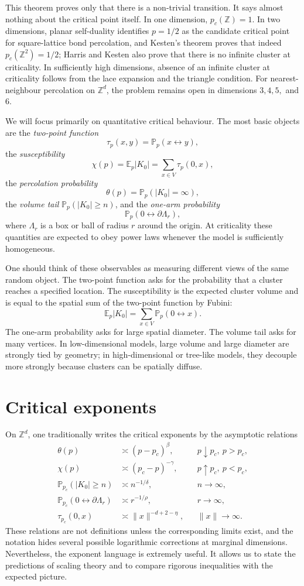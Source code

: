 \documentclass[11pt,reqno]{book}
\numberwithin{equation}{chapter}
\theoremstyle{plain}
\theoremstyle{definition}
\theoremstyle{remark}
\newcommand{\Pp}{\mathbb P_p}
\newcommand{\Ep}{\mathbb E_p}
\renewcommand{\P}{\mathbb P}
\newcommand{\Z}{\mathbb Z}
\newcommand{\1}{\mathbf 1}
\newcommand{\norm}[1]{\lVert #1\rVert}
\newcommand{\as}{\asymp}
\begin{document}
This theorem proves only that there is a non-trivial transition. It says almost nothing about the critical point itself. In one dimension, $p_c(\Z)=1$. In two dimensions, planar self-duality identifies $p=1/2$ as the candidate critical point for square-lattice bond percolation, and Kesten's theorem proves that indeed $p_c(\Z^2)=1/2$; Harris and Kesten also prove that there is no infinite cluster at criticality. In sufficiently high dimensions, absence of an infinite cluster at criticality follows from the lace expansion and the triangle condition. For nearest-neighbour percolation on $\Z^d$, the problem remains open in dimensions $3,4,5,$ and $6$.

We will focus primarily on quantitative critical behaviour. The most basic objects are the \emph{two-point function}
\[
  \tau_p(x,y)=\Pp(x\leftrightarrow y),
\]
the \emph{susceptibility}
\[
  \chi(p)=\Ep |K_0|=\sum_{x\in V}\tau_p(0,x),
\]
the \emph{percolation probability}
\[
  \theta(p)=\Pp(|K_0|=\infty),
\]
the \emph{volume tail} $\Pp(|K_0|\geq n)$, and the \emph{one-arm probability}
\[
  \Pp(0\leftrightarrow \partial \Lambda_r),
\]
where $\Lambda_r$ is a box or ball of radius $r$ around the origin. At criticality these quantities are expected to obey power laws whenever the model is sufficiently homogeneous.

One should think of these observables as measuring different views of the same random object. The two-point function asks for the probability that a cluster reaches a specified location. The susceptibility is the expected cluster volume and is equal to the spatial sum of the two-point function by Fubini:
\[
  \Ep |K_0|
  =
  \sum_{x\in V}\Pp(0\leftrightarrow x).
\]
The one-arm probability asks for large spatial diameter. The volume tail asks for many vertices. In low-dimensional models, large volume and large diameter are strongly tied by geometry; in high-dimensional or tree-like models, they decouple more strongly because clusters can be spatially diffuse.

\section{Critical exponents}

On $\Z^d$, one traditionally writes the critical exponents by the asymptotic relations
\begin{align*}
  \theta(p) &\as (p-p_c)^\beta, && p\downarrow p_c,\ p>p_c,\\
  \chi(p) &\as (p_c-p)^{-\gamma}, && p\uparrow p_c,\ p<p_c,\\
  \P_{p_c}(|K_0|\geq n) &\as n^{-1/\delta}, && n\to\infty,\\
  \P_{p_c}(0\leftrightarrow \partial\Lambda_r) &\as r^{-1/\rho}, && r\to\infty,\\
  \tau_{p_c}(0,x) &\as \norm{x}^{-d+2-\eta}, && \norm{x}\to\infty.
\end{align*}
These relations are not definitions unless the corresponding limits exist, and the notation hides several possible logarithmic corrections at marginal dimensions. Nevertheless, the exponent language is extremely useful. It allows us to state the predictions of scaling theory and to compare rigorous inequalities with the expected picture.
\end{document}
